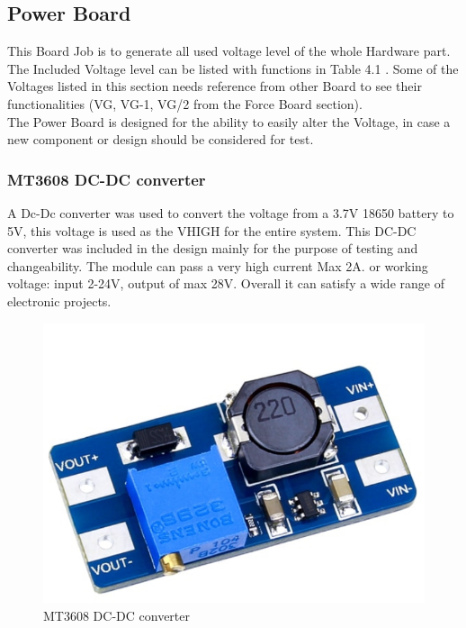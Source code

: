 \documentclass[12 pt, a4paper]{thesis}
\begin{document}
\pagebreak
\subsection{Power Board}
This Board Job is to generate all used voltage level of the whole Hardware part. The Included Voltage level can be listed with functions in Table 4.1 . Some of the Voltages listed in this section needs reference from other Board to see their functionalities (VG, VG-1, VG/2 from the Force Board section).\\
The Power Board is designed for the ability to easily alter the Voltage, in case a new component or design should be considered for test.
\subsubsection*{MT3608 DC-DC converter}
A Dc-Dc converter was used to convert the voltage from a 3.7V 18650 battery to 5V, this voltage is used as the VHIGH for the entire system.
This DC-DC converter was included in the design mainly for the purpose of testing and changeability. The module can pass a very high current Max 2A. or working voltage: input 2-24V, output of max 28V. Overall it can satisfy a wide range of electronic projects.
\begin{figure}[hbt!]
\centering
\includegraphics[width = 120mm]{MT3608.png}
\caption{MT3608 DC-DC converter}
\end{figure}
\end{document}
